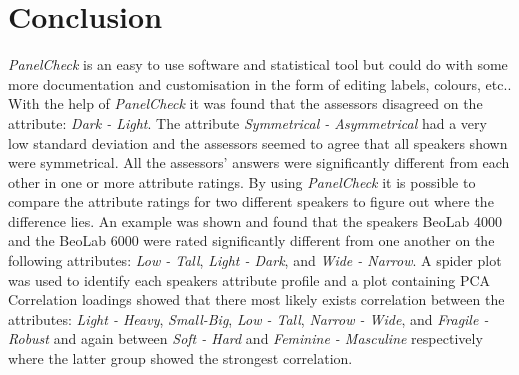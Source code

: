 \section*{Conclusion}
%
\textit{PanelCheck} is an easy to use software and statistical tool but could do with some more documentation and customisation in the form of editing labels, colours, etc.. With the help of \textit{PanelCheck} it was found that the assessors disagreed on the attribute: \textit{Dark - Light}. The attribute \textit{Symmetrical - Asymmetrical} had a very low standard deviation and the assessors seemed to agree that all speakers shown were symmetrical. All the assessors' answers were significantly different from each other in one or more attribute ratings. By using \textit{PanelCheck} it is possible to compare the attribute ratings for two different speakers to figure out where the difference lies. An example was shown and found that the speakers BeoLab 4000 and the BeoLab 6000 were rated significantly different from one another on the following attributes: \textit{Low - Tall}, \textit{Light - Dark}, and \textit{Wide - Narrow}. A spider plot was used to identify each speakers attribute profile and a plot containing PCA Correlation loadings showed that there most likely exists correlation between the attributes: \textit{Light - Heavy}, \textit{Small-Big}, \textit{Low - Tall}, \textit{Narrow - Wide}, and \textit{Fragile - Robust} and again between \textit{Soft - Hard} and \textit{Feminine - Masculine} respectively where the latter group showed the strongest correlation.
